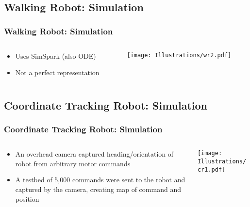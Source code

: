 \documentclass{beamer}
\begin{document}
\begin{frame}
\subsection*{Walking Robot: Simulation}
\begin{frame}
  \frametitle{Walking Robot: Simulation}
\begin{columns}
  \begin{column}{0.5\textwidth}
\begin{itemize}
\item  Uses SimSpark (also ODE)
\item  Not a perfect representation
\end{itemize}
\end{column}
\begin{column}{0.5\textwidth}
 \texttt{[image: Illustrations/wr2.pdf]}
       \\
\end{column}
\end{columns}
\end{frame}

\subsection*{Coordinate Tracking Robot: Simulation}
\begin{frame}
  \frametitle{Coordinate Tracking Robot: Simulation}
\begin{columns}
  \begin{column}{0.5\textwidth}
\begin{itemize}
\item An overhead camera captured heading/orientation of robot from arbitrary motor commands
\item A testbed of 5,000 commands were sent to the robot and captured by the camera, creating map of command and position
\end{itemize}
\end{column}
\begin{column}{0.5\textwidth}
 \texttt{[image: Illustrations/cr1.pdf]}
       \\
\end{column}
\end{columns}

\end{frame}


\end{frame}
\end{document}
